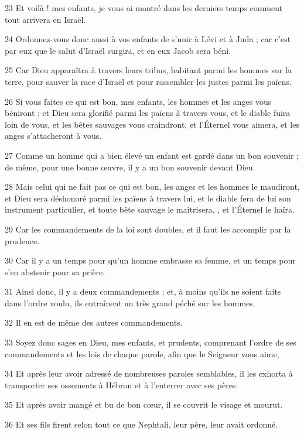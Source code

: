 \par 23 Et voilà ! mes enfants, je vous ai montré dans les derniers temps comment tout arrivera en Israël.

\par 24 Ordonnez-vous donc aussi à vos enfants de s'unir à Lévi et à Juda ; car c'est par eux que le salut d'Israël surgira, et en eux Jacob sera béni.

\par 25 Car Dieu apparaîtra à travers leurs tribus, habitant parmi les hommes sur la terre, pour sauver la race d'Israël et pour rassembler les justes parmi les païens.

\par 26 Si vous faites ce qui est bon, mes enfants, les hommes et les anges vous béniront ; et Dieu sera glorifié parmi les païens à travers vous, et le diable fuira loin de vous, et les bêtes sauvages vous craindront, et l'Éternel vous aimera, et les anges s'attacheront à vous.

\par 27 Comme un homme qui a bien élevé un enfant est gardé dans un bon souvenir ; de même, pour une bonne œuvre, il y a un bon souvenir devant Dieu.

\par 28 Mais celui qui ne fait pas ce qui est bon, les anges et les hommes le maudiront, et Dieu sera déshonoré parmi les païens à travers lui, et le diable fera de lui son instrument particulier, et toute bête sauvage le maîtrisera. , et l'Éternel le haïra.

\par 29 Car les commandements de la loi sont doubles, et il faut les accomplir par la prudence.

\par 30 Car il y a un temps pour qu'un homme embrasse sa femme, et un temps pour s'en abstenir pour sa prière.

\par 31 Ainsi donc, il y a deux commandements ; et, à moins qu’ils ne soient faits dans l’ordre voulu, ils entraînent un très grand péché sur les hommes.

\par 32 Il en est de même des autres commandements.

\par 33 Soyez donc sages en Dieu, mes enfants, et prudents, comprenant l'ordre de ses commandements et les lois de chaque parole, afin que le Seigneur vous aime,

\par 34 Et après leur avoir adressé de nombreuses paroles semblables, il les exhorta à transporter ses ossements à Hébron et à l'enterrer avec ses pères.

\par 35 Et après avoir mangé et bu de bon cœur, il se couvrit le visage et mourut.

\par 36 Et ses fils firent selon tout ce que Nephtali, leur père, leur avait ordonné.



